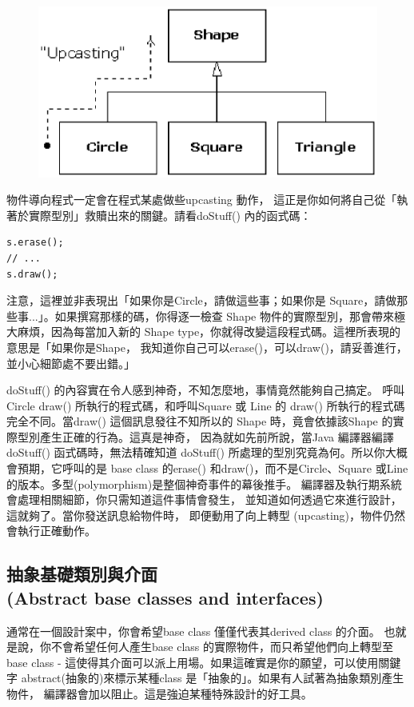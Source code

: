 \begin{figure}[htbp]
\centering
\includegraphics[scale=0.9]{eps/TIJ211.eps}
\end{figure}

物件導向程式一定會在程式某處做些upcasting 動作，
這正是你如何將自己從「執著於實際型別」救贖出來的關鍵。請看doStuff() 內的函式碼：
\begin{verbatim}
s.erase();
// ...
s.draw();
\end{verbatim}
注意，這裡並非表現出「如果你是Circle，請做這些事；如果你是
Square，請做那些事...」。如果撰寫那樣的碼，你得逐一檢查 Shape
物件的實際型別，那會帶來極大麻煩，因為每當加入新的
Shape type，你就得改變這段程式碼。這裡所表現的意思是「如果你是Shape，
我知道你自己可以erase()，可以draw()，請妥善進行，並小心細節處不要出錯。」

doStuff() 的內容實在令人感到神奇，不知怎麼地，事情竟然能夠自己搞定。
呼叫 Circle draw() 所執行的程式碼，和呼叫Square 或
Line 的 draw() 所執行的程式碼完全不同。當draw() 這個訊息發往不知所以的
Shape 時，竟會依據該Shape 的實際型別產生正確的行為。這真是神奇，
因為就如先前所說，當Java 編譯器編譯doStuff() 函式碼時，無法精確知道
doStuff() 所處理的型別究竟為何。所以你大概會預期，它呼叫的是
base class 的erase() 和draw()，而不是Circle、Square 或Line
的版本。多型(polymorphism)是整個神奇事件的幕後推手。
編譯器及執行期系統會處理相關細節，你只需知道這件事情會發生，
並知道如何透過它來進行設計，這就夠了。當你發送訊息給物件時，
即便動用了向上轉型 (upcasting)，物件仍然會執行正確動作。

\subsection{抽象基礎類別與介面 \\(Abstract base classes and interfaces)}

通常在一個設計案中，你會希望base class 僅僅代表其derived class 的介面。
也就是說，你不會希望任何人產生base class 的實際物件，而只希望他們向上轉型至
base class - 這使得其介面可以派上用場。如果這確實是你的願望，可以使用關鍵字
abstract(抽象的)來標示某種class 是「抽象的」。如果有人試著為抽象類別產生物件，
編譯器會加以阻止。這是強迫某種特殊設計的好工具。

